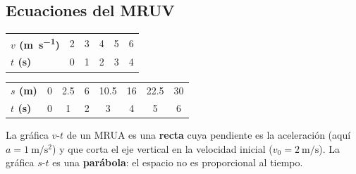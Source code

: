 \subsection{Ecuaciones del MRUV}

\begin{center}
    \begin{tabular}{@{}lccccc@{}}
        \toprule
        \textbf{\(v\) (\unit{\m\per\s})} & 2 & 3 & 4 & 5 & 6 \\[3pt]
        \textbf{\(t\) (\unit{\s})} & 0 & 1 & 2 & 3 & 4 \\
        \bottomrule
    \end{tabular}
    \qquad
    \begin{tabular}{@{}lccccccc@{}}
        \toprule
        \textbf{\(s\) (\unit{\m})} & 0 & \num{2.5} & 6 & \num{10.5} & 16 & \num{22.5} & 30 \\[3pt]
        \textbf{\(t\) (\unit{\s})} & 0 & 1 & 2 & 3 & 4 & 5 & 6 \\
        \bottomrule
    \end{tabular}
\end{center}

La gráfica \(v\)-\(t\) de un MRUA es una \textbf{recta} cuya pendiente es la aceleración (aquí \(a = \qty{1}{\m\per\square\s}\)) y que corta el eje vertical en la velocidad inicial (\(v_0 = \qty{2}{\m\per\s}\)). La gráfica \(s\)-\(t\) es una \textbf{parábola}: el espacio no es proporcional al tiempo.

